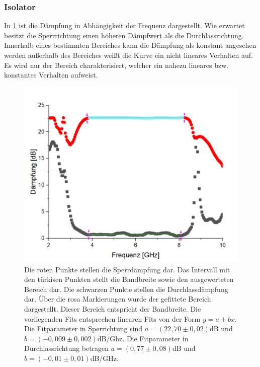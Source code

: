 \subsubsection{Isolator}
In \cref{Isolator} ist die Dämpfung in Abhängigkeit der Frequenz dargestellt. Wie erwartet besitzt die Sperrrichtung einen höheren Dämpfwert als die Durchlassrichtung. Innerhalb eines bestimmten Bereiches kann die Dämpfung als konstant angesehen werden außerhalb des Bereiches weißt die Kurve ein nicht lineares Verhalten auf. Es wird nur der Bereich charakterisiert, welcher ein nahezu lineares bzw. konstantes Verhalten aufweist.
\begin{figure}[h!]
	\centering
	\includegraphics[scale = 1]{Isolator11.png}
	\caption{Die roten Punkte stellen die Sperrdämpfung dar. Das Intervall mit den türkisen Punkten stellt die Bandbreite sowie den ausgewerteten Bereich dar. Die schwarzen Punkte stellen die Durchlassdämpfung dar. Über die rosa Markierungen wurde der gefittete Bereich dargestellt. Dieser Bereich entspricht der Bandbreite. Die vorliegenden Fits entsprechen linearen Fits von der Form $y = a + bx$. Die Fitparameter in Sperrichtung sind $a = (22,70 \pm 0,02)$dB und $b = (-0,009 \pm 0,002)$dB/Ghz. Die Fitparameter in Durchlassrichtung betragen $a = (0,77 \pm 0,08)$dB und $b = (-0,01 \pm 0,01)$dB/GHz.}
	\label{Isolator}
\end{figure}
